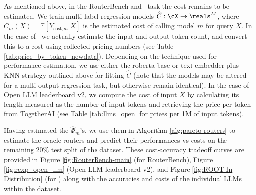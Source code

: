 As mentioned above, in the RouterBench and \newdata\ task the cost remains to be estimated. We train multi-label regression models $\widehat C: \cX \to \reals^M$, where $\hat{C}_m(X) =\mathbb{E}[Y_{\text{cost}, m}|X]$ is the estimated cost of calling model $m$ for query $X$. In the case of \newdata\ we actually estimate the input and output token count, and convert this to a cost using collected pricing numbers (see Table \ref{tab:price_by_token_newdata}). Depending on the technique used for performance estimation, we use either the {roberta-base} or text-embedder plus KNN strategy outlined above for fitting $\hat{C}$ (note that the models may be altered for a multi-output regression task, but otherwise remain identical).  In the case of Open LLM leaderboard v2, we compute the cost of input $X$ by calculating its length measured as the number of input tokens and retrieving the price per token from TogetherAI (see Table  \ref{tab:llms_open} for prices per 1M of input tokens).

Having estimated the $\widehat \Phi_m$'s, we use them in Algorithm \ref{alg:pareto-routers} to estimate the oracle routers and predict their performances vs costs on the remaining $20\%$ test split of the dataset. These cost-accuracy tradeoff curves are provided in Figure \ref{fig:RouterBench-main} (for RouterBench), Figure  \ref{fig:rexp_open_llm} (Open LLM leaderboard v2), and Figure \ref{fig:ROOT In Distribution} (for \newdata) along with the accuracies and costs of the individual LLMs within the dataset. 





